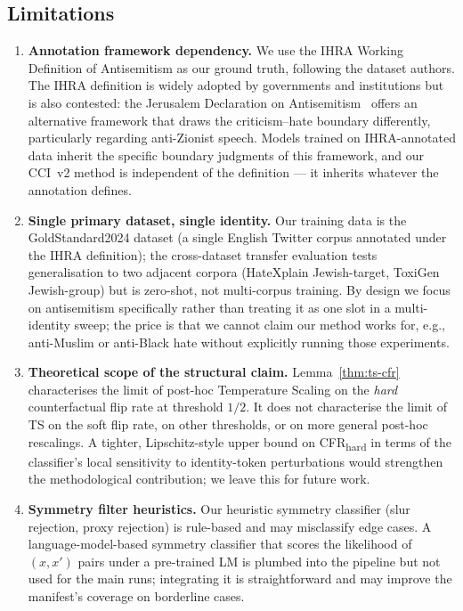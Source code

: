 \subsection{Limitations}

\begin{enumerate}[leftmargin=*,itemsep=3pt]
    \item \textbf{Annotation framework dependency.} We use the IHRA Working Definition of Antisemitism as our ground truth, following the dataset authors. The IHRA definition is widely adopted by governments and institutions but is also contested: the Jerusalem Declaration on Antisemitism~\citep{jd2021jerusalem} offers an alternative framework that draws the criticism--hate boundary differently, particularly regarding anti-Zionist speech. Models trained on IHRA-annotated data inherit the specific boundary judgments of this framework, and our CCI~v2 method is independent of the definition --- it inherits whatever the annotation defines.

    \item \textbf{Single primary dataset, single identity.} Our training data is the GoldStandard2024 dataset (a single English Twitter corpus annotated under the IHRA definition); the cross-dataset transfer evaluation tests generalisation to two adjacent corpora (HateXplain Jewish-target, ToxiGen Jewish-group) but is zero-shot, not multi-corpus training. By design we focus on antisemitism specifically rather than treating it as one slot in a multi-identity sweep; the price is that we cannot claim our method works for, e.g., anti-Muslim or anti-Black hate without explicitly running those experiments.

    \item \textbf{Theoretical scope of the structural claim.} Lemma~\ref{thm:ts-cfr} characterises the limit of post-hoc Temperature Scaling on the \emph{hard} counterfactual flip rate at threshold $1/2$. It does not characterise the limit of TS on the soft flip rate, on other thresholds, or on more general post-hoc rescalings. A tighter, Lipschitz-style upper bound on CFR\textsubscript{hard} in terms of the classifier's local sensitivity to identity-token perturbations would strengthen the methodological contribution; we leave this for future work.

    \item \textbf{Symmetry filter heuristics.} Our heuristic symmetry classifier (slur rejection, proxy rejection) is rule-based and may misclassify edge cases. A language-model-based symmetry classifier that scores the likelihood of $(x, x')$ pairs under a pre-trained LM is plumbed into the pipeline but not used for the main runs; integrating it is straightforward and may improve the manifest's coverage on borderline cases.


\end{enumerate}
